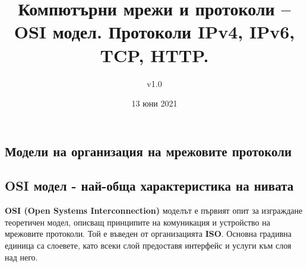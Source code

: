 \documentclass[fleqn,12pt]{article}
\title{Компютърни мрежи и протоколи – OSI модел. Протоколи IPv4,  IPv6, TCP, HTTP.}
\author{v1.0}
\date{13 юни 2021}
\begin{document}
\maketitle

\tableofcontents
\pagebreak

\begin{flushleft}

\section{Модели на организация на мрежовите протоколи}
\subsection{OSI модел - най-обща характеристика на нивата}
\textbf{OSI (Open Systems Interconnection)} моделът е първият опит за изграждане теоретичен модел, описващ принципите на комуникация и устройство на мрежовите протоколи.
Той е въведен от организацията \textbf{ISO}. Основна градивна единица са слоевете, като всеки слой предоставя интерфейс и услуги към слоя над него.


\end{flushleft}
\end{document}
